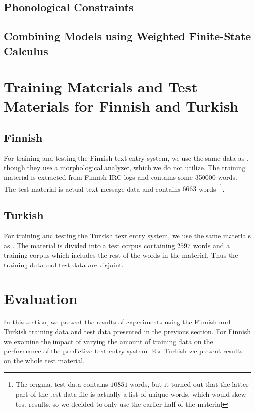 \documentclass{llncs}
\begin{document}
\subsection{Phonological Constraints}

\subsection{Combining Models using Weighted Finite-State Calculus}

\section{Training Materials and Test Materials for Finnish and Turkish}\label{data}

\subsection{Finnish}

For training and testing the Finnish text entry system, we use the
same data as \cite{silfverberg/2011/cla}, though they use a
morphological analyzer, which we do not utilize. The training material is extracted from Finnish IRC logs and contains some 350000 words. The test material is actual text message data and contains $6663$ words~\footnote{The original test data contains $10851$ words, but it turned out that the latter part of the test data file is actually a list of unique words, which would skew test results, so we decided to only use the earlier half of the material}. 

\subsection{Turkish}

For training and testing the Turkish text entry system, we use the
same materials as \cite{Tantug:2010}. The material is divided into a
test corpus containing $2597$ words and a training corpus which
includes the rest of the words in the material. Thus the training data
and test data are disjoint.

\section{Evaluation}\label{evaluation}

In this section, we present the results of experiments using the
Finnish and Turkish training data and test data presented in the
previous section. For Finnish we examine the impact of varying the
amount of training data on the performance of the predictive text
entry system. For Turkish we present results on the whole test
material.
\end{document}
